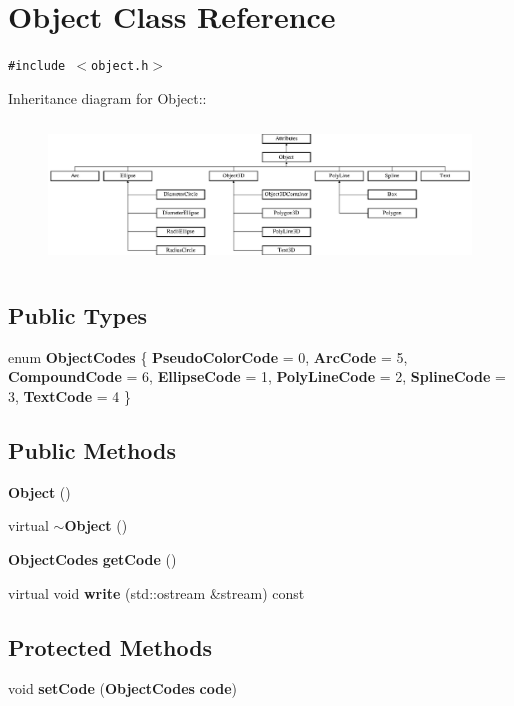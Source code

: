 \section{Object Class Reference}
\label{classObject}
{\tt \#include $<$object.h$>$}

Inheritance diagram for Object::\begin{figure}[H]
\begin{center}
\leavevmode
\includegraphics[height=3.82812cm]{classObject}
\end{center}
\end{figure}
\subsection*{Public Types}
\begin{CompactItemize}
\item 
enum {\bf Object\-Codes} \{ {\bf Pseudo\-Color\-Code} =  0, 
{\bf Arc\-Code} =  5, 
{\bf Compound\-Code} =  6, 
{\bf Ellipse\-Code} =  1, 
{\bf Poly\-Line\-Code} =  2, 
{\bf Spline\-Code} =  3, 
{\bf Text\-Code} =  4
 \}
\end{CompactItemize}
\subsection*{Public Methods}
\begin{CompactItemize}
\item 
{\bf Object} ()
\item 
virtual {\bf $\sim$Object} ()
\item 
{\bf Object\-Codes} {\bf get\-Code} ()
\item 
virtual void {\bf write} (std::ostream \&stream) const
\end{CompactItemize}
\subsection*{Protected Methods}
\begin{CompactItemize}
\item 
void {\bf set\-Code} ({\bf Object\-Codes} {\bf code})
\end{CompactItemize}
